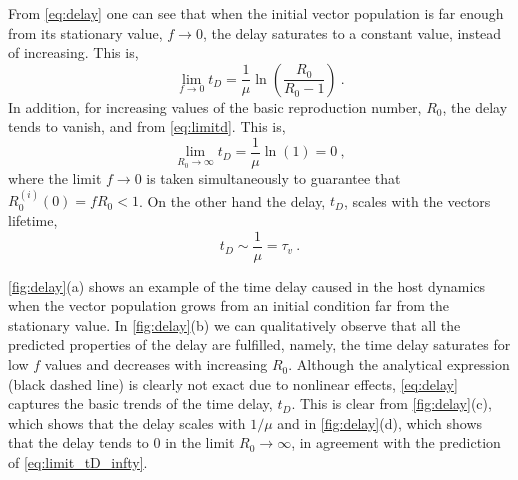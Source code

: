 From \cref{eq:delay} one can see that when the initial vector population
is far enough from its stationary value, $f\rightarrow 0$, the delay saturates
to a constant value, instead of increasing. This is,
\begin{equation}
    \lim_{f\to0}t_D=\frac{1}{\mu}\ln(\frac{R_0}{R_0-1}) \ .
    \label{eq:limitd}
\end{equation}
In addition, for increasing values of the basic reproduction number, $R_0$,
the delay tends to vanish, and from \cref{eq:limitd}. This is,
\begin{equation}
    \label{eq:limit_tD_infty}
    \lim_{R_0\to\infty}t_D=\frac{1}{\mu}\ln(1)=0\ ,
\end{equation}
where the limit $f\rightarrow 0$ is taken simultaneously to guarantee that
$R_0^{(i)}(0)=f R_0<1$. On the other hand the delay, $t_D$, scales with the
vectors lifetime,
\begin{equation}
    t_D\sim\frac{1}{\mu}=\tau_v \ .
\end{equation}

\cref{fig:delay}(a) shows an example of the time delay caused in the host
dynamics when the vector population grows from an initial condition far from
the stationary value. In \cref{fig:delay}(b) we can qualitatively observe that
all the predicted properties of the delay are fulfilled, namely, the time delay
saturates for low $f$ values and decreases with increasing $R_0$. Although the
analytical expression (black dashed line) is clearly not exact due to nonlinear
effects, \cref{eq:delay} captures the basic trends of the time delay, $t_D$.
This is clear from \cref{fig:delay}(c), which shows that the delay scales with
$1/\mu$ and in \cref{fig:delay}(d), which shows that the delay tends to $0$ in
the limit $R_0\rightarrow\infty$, in agreement with the prediction of
\cref{eq:limit_tD_infty}.


